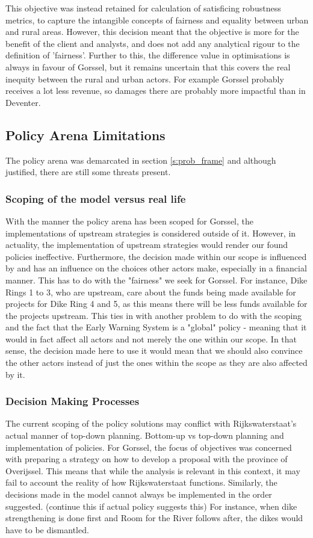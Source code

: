 This objective was instead retained for calculation of satisficing robustness metrics, to capture the intangible concepts of fairness and equality between urban and rural areas. However, this decision meant that the objective is more for the benefit of the client and analysts, and does not add any analytical rigour to the definition of 'fairness'. Further to this, the difference value in optimisations is always in favour of Gorssel, but it remains uncertain that this covers the real inequity between the rural and urban actors. For example Gorssel probably receives a lot less revenue, so damages there are probably more impactful than in Deventer.


\subsection{Policy Arena Limitations}

The policy arena was demarcated in section \ref{s:prob_frame} and although justified, there are still some threats present. 

\subsubsection{Scoping of the model versus real life}
With the manner the policy arena has been scoped for Gorssel, the implementations of upstream strategies is considered outside of it. However, in actuality, the implementation of upstream strategies would render our found policies ineffective. Furthermore, the decision made within our scope is influenced by and has an influence on the choices other actors make, especially in a financial manner. This has to do with the "fairness" we seek for Gorssel. For instance, Dike Rings 1 to 3, who are upstream, care about the funds being made available for projects for Dike Ring 4 and 5, as this means there will be less funds available for the projects upstream. This ties in with another problem to do with the scoping and the fact that the Early Warning System is a "global" policy - meaning that it would in fact affect all actors and not merely the one within our scope. In that sense, the decision made here to use it would mean that we should also convince the other actors instead of just the ones within the scope as they are also affected by it. 

\subsubsection{Decision Making Processes}
The current scoping of the policy solutions may conflict with Rijkswaterstaat's actual manner of top-down planning. Bottom-up vs top-down planning and implementation of policies. For Gorssel, the focus of objectives was concerned with preparing a strategy on how to develop a proposal with the province of Overijssel. This means that while the analysis is relevant in this context, it may fail to account the reality of how Rijkswaterstaat functions. Similarly, the decisions made in the model cannot always be implemented in the order suggested. (continue this if actual policy suggests this) For instance, when dike strengthening is done first and Room for the River follows after, the dikes would have to be dismantled. 

